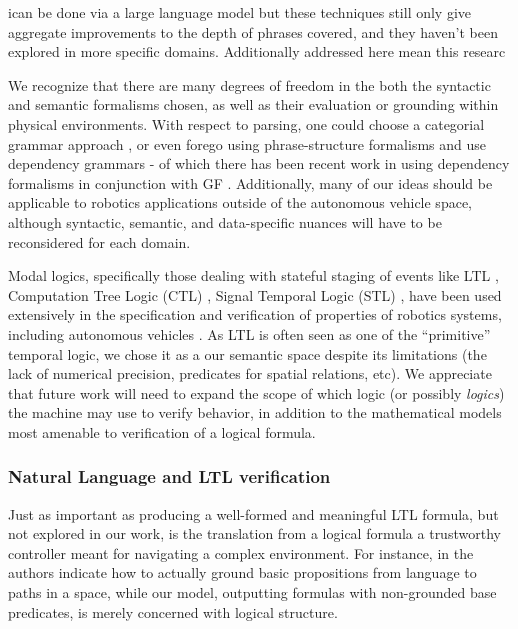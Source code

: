 \documentclass[a4paper, 11pt]{article}
\begin{document}


ican be done via a large language model 
 but these techniques still only give
aggregate improvements to the depth of phrases covered, and they haven't been
explored in more specific domains. Additionally
addressed here mean this researc

We recognize that there are many degrees of freedom in the both the syntactic
and semantic formalisms chosen, as well as their evaluation or grounding within
physical environments. With respect to parsing, one could choose a categorial
grammar approach \cite{5152776}, or even forego using phrase-structure
formalisms and use dependency grammars - of which there has been recent work in
using dependency formalisms in conjunction with GF \cite{ranta2017cross}.
Additionally, many of our ideas should be applicable to robotics applications
outside of the autonomous vehicle space, although syntactic, semantic, and
data-specific nuances will have to be reconsidered for each domain.



Modal logics, specifically those dealing with stateful staging of events like
LTL \cite{ltl95}, Computation Tree Logic (CTL) \cite{yooCTL}, Signal Temporal
Logic (STL) \cite{stlAut} , have been used extensively in the specification and
verification of properties of robotics systems, including autonomous vehicles .
As LTL is often seen as one of the ``primitive'' temporal logic, we chose it as
a our semantic space despite its limitations (the lack of numerical precision,
predicates for spatial relations, etc). We appreciate that future work will need
to expand the scope of which logic (or possibly \emph{logics}) the machine may
use to verify behavior, in addition to the mathematical models most amenable to
verification of a logical formula.


\subsubsection{Natural Language and LTL verification}


Just as important as producing a
well-formed and meaningful LTL formula, but not explored in our work, is the
translation from a logical formula a trustworthy controller meant for navigating
a complex environment. For instance, in \cite{plaku2016motion} the authors
indicate how to actually ground basic propositions from language to paths in a
space, while our model, outputting formulas with non-grounded base predicates,
is merely concerned with logical structure.
\end{document}
